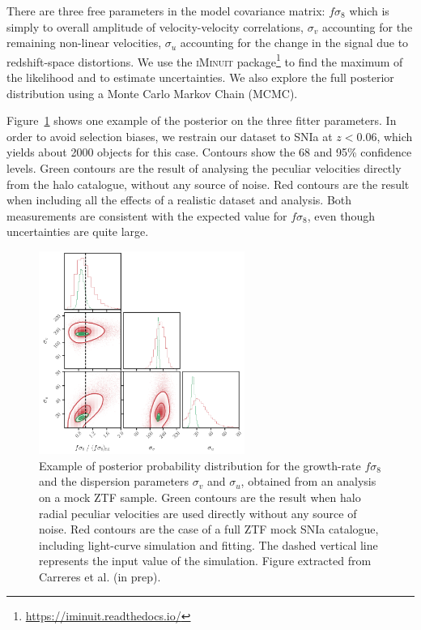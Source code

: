 There are three free parameters in the model covariance matrix: $f\sigma_8$ which is simply to overall 
amplitude of velocity-velocity correlations, $\sigma_v$ accounting for the remaining non-linear 
velocities, $\sigma_u$ accounting for the change in the signal due to redshift-space distortions. 
We use the \textsc{iMinuit} package\footnote{\url{https://iminuit.readthedocs.io/}} to find the maximum 
of the likelihood and to estimate uncertainties. We also explore the full posterior distribution 
using a Monte Carlo Markov Chain (MCMC). 

Figure~\ref{fig:ztf_snsim_posterior} shows one example of the posterior on the three fitter parameters. 
In order to avoid selection biases, we restrain our dataset to SNIa at $z<0.06$, 
which yields about 2000 objects for this case.
Contours show the 68 and 95\% confidence levels. Green contours are the result of analysing the 
peculiar velocities directly from the halo catalogue, without any source of noise. Red contours 
are the result when including all the effects of a realistic dataset and analysis. 
Both measurements are consistent with the expected value for $f\sigma_8$, even though uncertainties 
are quite large.

\begin{figure}
    \centering
    \includegraphics[width=0.6\textwidth]{fig/velocities/bastien_posterior_fs8.png}
    \caption{Example of posterior probability distribution for the growth-rate $f\sigma_8$ 
    and the dispersion parameters $\sigma_v$ and $\sigma_u$, obtained from an analysis 
    on a mock ZTF sample. Green contours are the result when halo radial peculiar velocities 
    are used directly without any source of noise. Red contours are the case of a full ZTF mock 
    SNIa catalogue, including light-curve simulation and fitting. The dashed vertical line represents
    the input value of the simulation.  
    Figure extracted from Carreres et al. (in prep).}
    \label{fig:ztf_snsim_posterior}
\end{figure}

